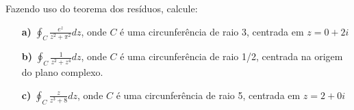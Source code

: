 \linespread{1.5}
Fazendo uso do teorema dos resíduos, calcule: \begin{itemize}
    \item[\textbf{a)}] {\Large$\oint_C \frac{e^z}{z^2 + \pi^2}dz$}, onde $C$ é uma circunferência de raio 3, centrada em $z=0+2i$
    \item[\textbf{b)}] {\Large$\oint_C \frac{1}{z^2 + z^4}dz$}, onde $C$ é uma circunferência de raio 1/2, centrada na origem do plano complexo.
    \item[\textbf{c)}] {\Large$\oint_C \frac{z}{z^3 + 8}dz$}, onde $C$ é uma circunferência de raio 5, centrada em $z=2+0i$
\end{itemize}